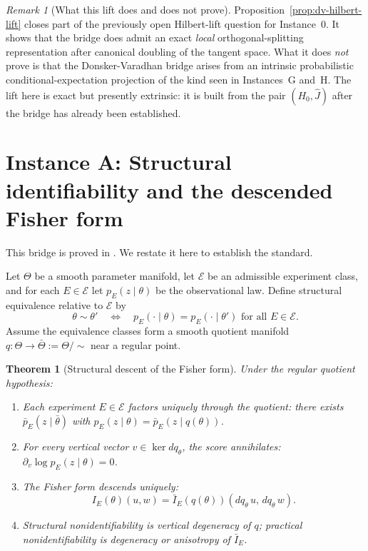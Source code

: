 \documentclass[11pt,a4paper]{article}
\numberwithin{equation}{section}
\theoremstyle{thmcompact}
\newtheorem{theorem}{Theorem}[section]
\theoremstyle{remark}
\newtheorem*{remarkplain}{Remark}
\newenvironment{remark}[1][]%
{\begin{remarkbox}\begin{remarkplain}[#1]\normalfont}
		{\end{remarkplain}\end{remarkbox}}
\begin{document}
\begin{remark}[What this lift does and does not prove]\label{rem:dv-hilbert-lift}
Proposition~\ref{prop:dv-hilbert-lift} closes part of the previously open Hilbert-lift question for Instance~0. It shows that the bridge does admit an exact \emph{local} orthogonal-splitting representation after canonical doubling of the tangent space. What it does \emph{not} prove is that the Donsker-Varadhan bridge arises from an intrinsic probabilistic conditional-expectation projection of the kind seen in Instances~G and~H. The lift here is exact but presently extrinsic: it is built from the pair $(H_0,\widehat J)$ after the bridge has already been established.
\end{remark}

\section{Instance A: Structural identifiability and the descended Fisher form}
\label{sec:bridge-A}

This bridge is proved in \cite{Dunkley2026b}. We restate it here to establish the standard.

Let $\Theta$ be a smooth parameter manifold, let $\mathcal{E}$ be an admissible experiment class, and for each $E \in \mathcal{E}$ let $p_E(z \mid \theta)$ be the observational law. Define structural equivalence relative to $\mathcal{E}$ by
\[
\theta \sim \theta' \quad \Longleftrightarrow \quad p_E(\cdot \mid \theta) = p_E(\cdot \mid \theta') \text{ for all } E \in \mathcal{E}.
\]
Assume the equivalence classes form a smooth quotient manifold $q: \Theta \to \bar{\Theta} := \Theta / {\sim}$ near a regular point.

\begin{theorem}[Structural descent of the Fisher form]\label{thm:bridge-A}
Under the regular quotient hypothesis:
\begin{enumerate}[label=\textup{(\roman*)}]
\item Each experiment $E \in \mathcal{E}$ factors uniquely through the quotient: there exists $\bar{p}_E(z \mid \bar{\theta})$ with $p_E(z \mid \theta) = \bar{p}_E(z \mid q(\theta))$.
\item For every vertical vector $v \in \ker dq_\theta$, the score annihilates: $\partial_v \log p_E(z \mid \theta) = 0$.
\item The Fisher form descends uniquely:
\[
I_E(\theta)(u, w) = \bar{I}_E(q(\theta))(dq_\theta\, u,\, dq_\theta\, w).
\]
\item Structural nonidentifiability is vertical degeneracy of $q$; practical nonidentifiability is degeneracy or anisotropy of $\bar{I}_E$.
\end{enumerate}
\end{theorem}
\end{document}
